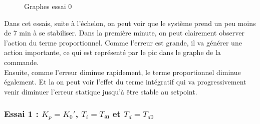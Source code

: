 \begin{figure}[H]
    \centering
    \caption{Graphes essai 0}
    \label{fig:essai-0}
\end{figure}

Dans cet essais, suite à l'échelon, on peut voir que le système prend un peu 
moins de 7 min à se stabiliser. Dans la première minute, on peut clairement
observer l'action du terme proportionnel. Comme l'erreur est grande, 
il va générer une action importante, ce qui est représenté par le pic
dans le graphe de la commande.\\

Ensuite, comme l'erreur diminue rapidement, le terme proportionnel diminue également.
Et la on peut voir l'effet du terme intégratif qui va progressivement venir
diminuer l'erreur statique jusqu'à être stable au setpoint.


\subsubsection{Essai 1 : $K_{p} = K_{0}'$, $T_{i} = T_{i0}$ et $T_{d} = T_{d0}$}

